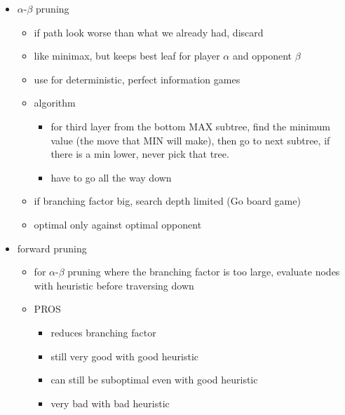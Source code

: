 \documentclass[11pt]{article}
\newcommand{\ee}[1]{\ensuremath{#1}}
\begin{document}
\begin{description}
\begin{itemize}
\begin{itemize}
		\item \ee{\alpha}-\ee{\beta} pruning
		\begin{itemize}
			\item if path look worse than what we already had, discard
			\item like minimax, but keeps best leaf for player \ee{\alpha} and opponent \ee{\beta}
			\item use for deterministic, perfect information games
			\item algorithm
			\begin{itemize}
				\item for third layer from the bottom MAX subtree, find the minimum value (the move that MIN will make), then go to next subtree, if there is a min lower, never pick that tree.
				\item have to go all the way down
			\end{itemize}
			\item if branching factor big, search depth limited (Go board game)
			\item optimal only against optimal opponent 
		\end{itemize}
	
		\item forward pruning
		\begin{itemize}
			\item for \ee{\alpha}-\ee{\beta} pruning where the branching factor is too large, evaluate nodes with heuristic before traversing down
			\item PROS
			\begin{itemize}
				\item reduces branching factor
				\item still very good with good heuristic
			\end{itemize}
			\begin{itemize}
				\item can still be suboptimal even with good heuristic
				\item very bad with bad heuristic
			\end{itemize}
		\end{itemize}
	\end{itemize}
\end{itemize}


\end{description}
\end{document}
